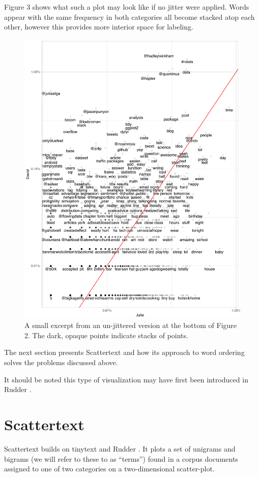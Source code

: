 \documentclass[11pt,a4paper]{article}
\begin{document}
Figure 3 shows what such a plot may look like if no jitter were applied.  Words appear with the same frequency in both categories all become stacked atop each other, however this provides more interior space for labeling. 
\begin{figure}[h]
\vspace{-.25cm}
\includegraphics[width=\columnwidth]{tidytext_horiz}
\caption{A small excerpt from an un-jittered version at the bottom of Figure 2.  The dark, opaque points indicate stacks of points.}
\label{nojitterfig}
\vspace{-.25cm}
\end{figure}
The next section presents Scattertext and how its approach to word ordering solves the problems discussed above.

It should be noted this type of visualization may have first been introduced in Rudder .
\section{Scattertext}
\label{scattertext}
Scattertext builds on tinytext and Rudder .  It plots a set of unigrams and bigrams (we will refer to these to as ``terms'') found in a corpus documents assigned to one of two categories on a two-dimensional scatter-plot.  
\end{document}
